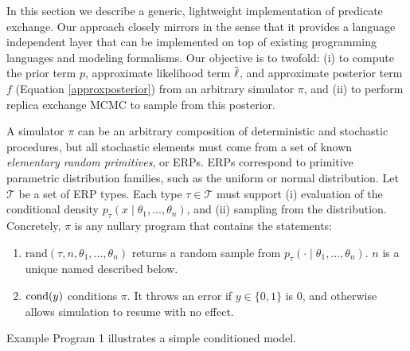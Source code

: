 

In this section we describe a generic, lightweight implementation of predicate exchange.
Our approach closely mirrors \citep{wingate2011lightweight, milch20071} in the sense that it provides a language independent layer that can be implemented on top of existing programming languages and modeling formalisms.
Our objective is to twofold: (i) to compute the prior term $p$, approximate likelihood term $\tilde{\operatorname{\ell}}$, and approximate posterior term $f$ (Equation \ref{approxposterior}) from an arbitrary simulator $\pi$, and (ii) to perform replica exchange MCMC to sample from this posterior.

A simulator $\pi$ can be an arbitrary composition of deterministic and stochastic procedures, but all stochastic elements must come from a set of known \emph{elementary random primitives}, or ERPs.
ERPs correspond to primitive parametric distribution families, such as the uniform or normal distribution.
Let $\mathcal{T}$ be a set of ERP types.
Each type $\tau \in \mathcal{T}$ must support (i) evaluation of the conditional density $p_\tau(x \mid \theta_1, ..., \theta_n)$, and (ii) sampling from the distribution.
Concretely, $\pi$ is any nullary program that contains the statements:

\begin{enumerate}
  \item $\textrm{rand}(\tau, n, \theta_1, ...,\theta_n)$ returns a random sample from $p_\tau(\cdot \mid \theta_1, ..., \theta_n)$.  $n$ is a unique named described below.
  \item $\operatorname{cond}(y)$ conditions $\pi$.  It throws an error if $y \in \{0, 1\}$ is 0, and otherwise allows simulation to resume with no effect.
\end{enumerate}

Example Program 1 illustrates a simple conditioned model.

